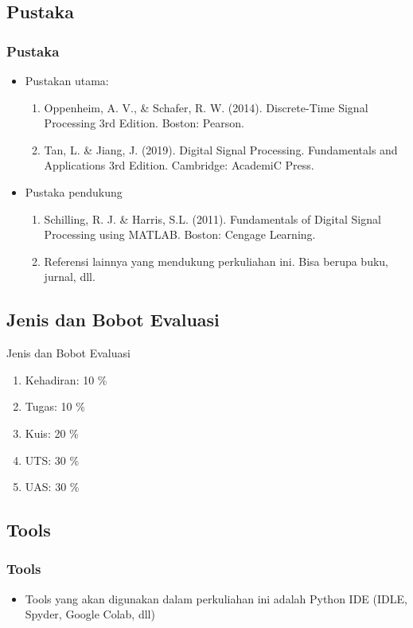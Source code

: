 \documentclass[pdflatex,compress]{beamer}
\begin{document}
\subsection{Pustaka}

\begin{frame}
	\frametitle{Pustaka}
	\begin{itemize}
		\item Pustakan utama:
		\begin{enumerate}
			\item Oppenheim, A. V., \& Schafer, R. W. (2014). Discrete-Time Signal Processing 3rd Edition. Boston: Pearson.
			\item Tan, L. \& Jiang, J. (2019). Digital Signal Processing. Fundamentals and Applications 3rd Edition. Cambridge: AcademiC Press.
		\end{enumerate}
		\item Pustaka pendukung
		\begin{enumerate}
			\item Schilling, R. J. \& Harris, S.L. (2011). Fundamentals of Digital Signal Processing using MATLAB. Boston:
			Cengage Learning.
			\item Referensi lainnya yang mendukung perkuliahan ini. Bisa berupa buku, jurnal, dll.
		\end{enumerate}
	\end{itemize}
\end{frame}

\subsection{Jenis dan Bobot Evaluasi}

\begin{frame}{Jenis dan Bobot Evaluasi}
	\begin{enumerate}
		\item Kehadiran: 10 \%
		\item Tugas: 10 \%
		\item Kuis: 20 \%
		\item UTS: 30 \%
		\item UAS: 30 \%
	\end{enumerate}
\end{frame}

\subsection{Tools}

\begin{frame}
	\frametitle{Tools}
	\begin{itemize}
		\item Tools yang akan digunakan dalam perkuliahan ini adalah Python IDE (IDLE, Spyder, Google Colab, dll)
	\end{itemize}
\end{frame}
\end{document}
